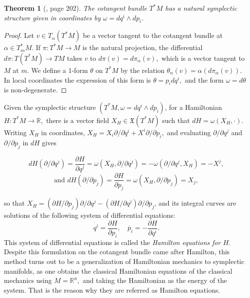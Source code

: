 \documentclass[12pt, letterpaper, reqno]{amsart}
\theoremstyle{definition}
\theoremstyle{plain}
\newtheorem{thm}{Theorem}
\theoremstyle{remark}
\providecommand{\DIFdelbegin}{} %
\providecommand{\DIFdelend}{} %
\newcommand{\DIFscaledelfig}{0.5}
\newlength{\DIFdelgraphicswidth} %
\newlength{\DIFdelgraphicsheight} %
\newcommand{\DIFdelincludegraphics}[2][]{%
\sbox{\DIFdelgraphicsbox}{\DIFOincludegraphics[#1]{#2}}%
\settoboxwidth{\DIFdelgraphicswidth}{\DIFdelgraphicsbox} %
\settoboxtotalheight{\DIFdelgraphicsheight}{\DIFdelgraphicsbox} %
\scalebox{\DIFscaledelfig}{%
\parbox[b]{\DIFdelgraphicswidth}{\usebox{\DIFdelgraphicsbox}\\[-\baselineskip] \rule{\DIFdelgraphicswidth}{0em}}\llap{\resizebox{\DIFdelgraphicswidth}{\DIFdelgraphicsheight}{%
\setlength{\unitlength}{\DIFdelgraphicswidth}%
\begin{picture}(1,1)%
\thicklines\linethickness{2pt} %
{\color[rgb]{1,0,0}\put(0,0){\framebox(1,1){}}}%
{\color[rgb]{1,0,0}\put(0,0){\line( 1,1){1}}}%
{\color[rgb]{1,0,0}\put(0,1){\line(1,-1){1}}}%
\end{picture}%
}\hspace*{3pt}}} %
} %
\DeclareRobustCommand{\DIFdelbegin}{\DIFOdelbegin \let\includegraphics\DIFdelincludegraphics} %
\DeclareRobustCommand{\DIFdelend}{\DIFOaddend \let\includegraphics\DIFOincludegraphics} %
\begin{document}
\begin{thm}[\cite{arnol2013mathematical}, page 202]
	The cotangent bundle $ T^*M $ has a natural symplectic structure given in coordinates by $\omega = dq^i\wedge dp_i.$
\end{thm}

\begin{proof}
	Let $ v\in T_\alpha \left( T^*M \right)  $ be a vector tangent to the cotangent bundle at $ \alpha\in T^*_m M. $ If $ \pi:T^*M \rightarrow M $ is the natural projection, the differential $ d\pi : T \left( T^*M \right) \rightarrow TM $ takes $ v $ to $ d\pi(v)=d\pi_\alpha(v), $ which is a vector tangent to $ M $ at $ m. $ We define a 1-form $ \theta $ on $ T^*M $ by the relation $ \theta_\alpha(v)=\alpha(d\pi_\alpha(v)). $ In local coordinates the expression of this form is $ \theta= p_i dq^i, $ and the form $ \omega = d\theta $ is non-degenerate. 
\end{proof}

Given the symplectic structure $ (T^*M, \omega = dq^i\wedge dp_i) $, for a Hamiltonian $ H: T^*M \rightarrow \mathbb{R}, $ there is a vector field $ X_H \in \mathfrak{X}(T^*M) $ such that $ dH = \omega (X_H,\cdot) $. Writing $ X_H $ in coordinates, $ X_H = X_i \partial/\partial q^i + X^i \partial/\partial p_i, $ and evaluating $ \partial/\partial q^j $ and $ \partial/\partial p_j $ in $ dH $ gives  

$$ dH(\partial/\partial q^j) = \frac{\partial H}{\partial q^j} = \omega(X_H, \partial/\partial q^j) = -\omega(\partial/\partial q^j, X_H) = -X^j,$$ 
$$\text{and } dH(\partial/\partial p_j) = \frac{\partial H}{\partial p_j} =\omega(X_H, \partial/\partial p_j)=X_j, $$ 
\DIFdelbegin %

\DIFdelend so that $ X_H = (\partial H/\partial p_j)\partial/\partial q^j - (\partial H / \partial q^j)\partial/\partial p_j $, and its integral curves are solutions of the following system of differential equations:
\begin{equation}\label{eq:hamilton_equations}
 \dot{q^i} = \frac{\partial H}{\partial p_i}, \quad \dot{p_i} =- \frac{\partial H}{\partial q^i}.    
\end{equation}
This system of differential equations is called the \textit{Hamilton equations for $ H $.} Despite this formulation on the cotangent bundle came after Hamilton, this method turns out to be a generalization of Hamiltonian mechanics to symplectic manifolds, as one obtains the classical Hamiltonian equations of the classical mechanics using $ M= \mathbb{R}^n, $ and taking the Hamiltonian as the energy of the system. That is the reason why they are referred as Hamilton equations.
\end{document}

